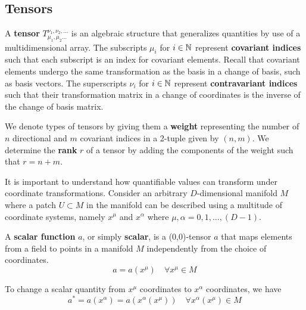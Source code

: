 \documentclass{article}
\begin{document}
 	\subsection{Tensors}
 		\begin{defn}
 			A \textbf{tensor} $T_{\mu_1, \mu_2 \dots}^{\nu_1, \nu_2, \dots}$ is an algebraic structure that generalizes quantities by use of a multidimensional array. The subscripts $\mu_i$ for $i \in \mathbb{N}$ represent \textbf{covariant indices} such that each subscript is an index for covariant elements. Recall that covariant elements undergo the same transformation as the basis in a change of basis, such as basis vectors. The superscripts $\nu_i$ for $i \in \mathbb{N}$ represent \textbf{contravariant indices} such that their transformation matrix in a change of coordinates is the inverse of the change of basis matrix.
 		\end{defn}
 		\begin{defn}
 			We denote types of tensors by giving them a \textbf{weight} representing the number of $n$ directional and $m$ covariant indices in a 2-tuple given by $(n,m)$. We determine the\textbf{ rank} $r$ of a tensor by adding the components of the weight such that $r=n+m$.
 		\end{defn}
 		It is important to understand how quantifiable values can transform under coordinate transformations. Consider an arbitrary $D$-dimensional manifold $M$ where a patch $U \subset M$ in the manifold can be described using a multitude of coordinate systems, namely $x^\mu$ and $x^\alpha$ where $\mu,\alpha = 0,1,\dots,(D-1)$.
 		
 		\begin{defn}
 			A \textbf{scalar function} $a$, or simply \textbf{scalar}, is a (0,0)-tensor $a$ that maps elements from a field to points in a manifold $M$ independently from the choice of coordinates.
 			$$ a = a(x^\mu) \quad \forall x^\mu \in M$$
 		\end{defn} \noindent
 		To change a scalar quantity from $x^\mu$ coordinates to $x^\alpha$ coordinates, we have
 		$$ a^* = a \left( x^\alpha \right) = a\left( x^\alpha (x^\mu) \right) \quad \forall x^\alpha (x^\mu) \in M$$
 		
\end{document}
